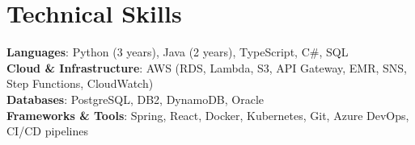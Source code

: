 \section{Technical Skills}
 \begin{itemize}[leftmargin=0.15in, label={}]
    \small{\item{
      \textbf{Languages}{: Python (3 years), Java (2 years), TypeScript, C\#, SQL} \\ 
     \textbf{Cloud \& Infrastructure}{: AWS (RDS, Lambda, S3, API Gateway, EMR, SNS, Step Functions, CloudWatch)} \\
    \textbf{Databases}{: PostgreSQL, DB2, DynamoDB, Oracle} \\
    \textbf{Frameworks \& Tools}{: Spring, React, Docker, Kubernetes, Git, Azure DevOps, CI/CD pipelines} \\
    }}
 \end{itemize}